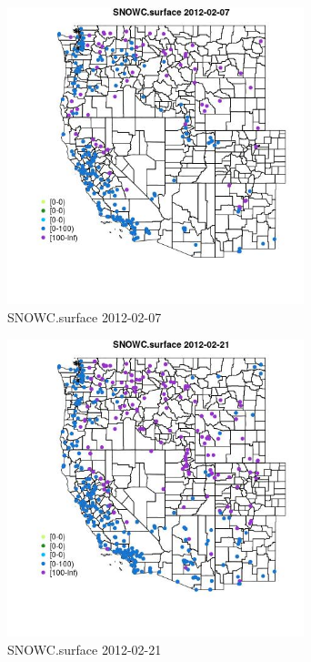 \begin{figure} 
\centering  
\includegraphics[width=0.77\textwidth]{Code_Outputs/Report_ML_input_PM25_Step4_part_f_de_duplicated_aveswNAs_MapObsSNOWCsurface2012-02-07.jpg} 
\caption{\label{fig:Report_ML_input_PM25_Step4_part_f_de_duplicated_aveswNAsMapObsSNOWCsurface2012-02-07}SNOWC.surface 2012-02-07} 
\end{figure} 
 

\begin{figure} 
\centering  
\includegraphics[width=0.77\textwidth]{Code_Outputs/Report_ML_input_PM25_Step4_part_f_de_duplicated_aveswNAs_MapObsSNOWCsurface2012-02-21.jpg} 
\caption{\label{fig:Report_ML_input_PM25_Step4_part_f_de_duplicated_aveswNAsMapObsSNOWCsurface2012-02-21}SNOWC.surface 2012-02-21} 
\end{figure} 
 

